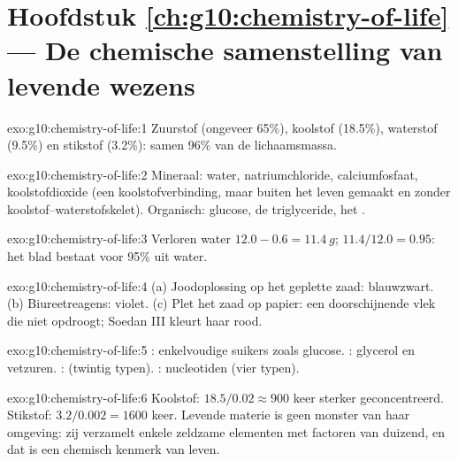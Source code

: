\section*{Hoofdstuk \ref{ch:g10:chemistry-of-life} --- De chemische samenstelling van levende wezens}

\begin{solution}{exo:g10:chemistry-of-life:1}
Zuurstof (ongeveer 65\%), koolstof (18.5\%), waterstof (9.5\%) en
stikstof (3.2\%): samen 96\% van de lichaamsmassa.
\end{solution}

\begin{solution}{exo:g10:chemistry-of-life:2}
Mineraal: water, natriumchloride, calciumfosfaat, koolstofdioxide (een
koolstofverbinding, maar buiten het leven gemaakt en zonder
koolstof--waterstofskelet). Organisch: glucose, de triglyceride, het
.
\end{solution}

\begin{solution}{exo:g10:chemistry-of-life:3}
Verloren water $12.0 - 0.6 = \qty{11.4}{g}$; $11.4/12.0 = 0.95$: het
blad bestaat voor 95\% uit water.
\end{solution}

\begin{solution}{exo:g10:chemistry-of-life:4}
(a) Joodoplossing op het geplette zaad: blauwzwart. (b) Biureetreagens:
violet. (c) Plet het zaad op papier: een doorschijnende vlek die niet
opdroogt; Soedan III kleurt haar rood.
\end{solution}

\begin{solution}{exo:g10:chemistry-of-life:5}
: enkelvoudige suikers zoals glucose. : glycerol en
vetzuren. :  (twintig typen). :
nucleotiden (vier typen).
\end{solution}

\begin{solution}{exo:g10:chemistry-of-life:6}
Koolstof: $18.5/0.02 \approx 900$ keer sterker geconcentreerd. Stikstof:
$3.2/0.002 = 1600$ keer. Levende materie is geen monster van haar
omgeving: zij verzamelt enkele zeldzame elementen met factoren van
duizend, en dat is een chemisch kenmerk van leven.
\end{solution}

